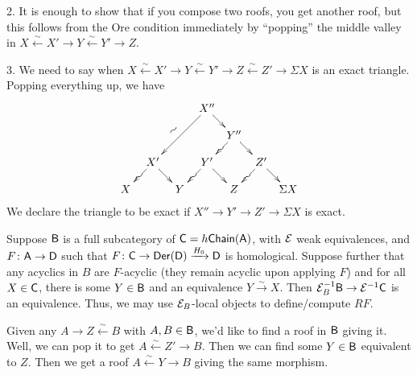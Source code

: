 2. It is enough to show that if you compose two roofs, you get another roof, but this follows from the Ore condition immediately by ``popping'' the middle valley in $X\xleftarrow\sim X'\to Y\xleftarrow\sim Y' \to Z$.

3. We need to say when $X\xleftarrow\sim X'\to Y\xleftarrow\sim Y' \to Z \xleftarrow\sim Z'\to \Sigma X$ is an exact triangle. Popping everything up, we have
\[\xymatrix@!0{
 & & & X''\ar[ddll]_@{~}\ar[dr]\\
 & & & & Y'' \ar[dl]|@{~}\ar[dr]\\
 & X'\ar[dl]|@{~}\ar[dr] && Y'\ar[dl]|@{~}\ar[dr] && Z'\ar[dl]|@{~}\ar[dr]\\
 X&&Y&&Z&& \Sigma X
}\]
We declare the triangle to be exact if $X''\to Y'\to Z'\to \Sigma X$ is exact.

\begin{proposition}
 Suppose $\text{\sf B}$ is a full subcategory of $\text{\sf C}=h\text{\sf Chain}(\text{\sf A})$, with $\mathcal{E}$ weak equivalences, and $F\colon \text{\sf A}\to \text{\sf D}$ such that $F\colon \text{\sf C}\to \operatorname{\sf Der}(\text{\sf D})\xrightarrow{H_0}\text{\sf D}$ is homological. Suppose further that any acyclics in $B$ are $F$-acyclic (they remain acyclic upon applying $F$) and for all $X\in \text{\sf C}$, there is some $Y\in \text{\sf B}$ and an equivalence $Y\xrightarrow\sim X$. Then $\mathcal{E}_B^{-1}\text{\sf B}\to \mathcal{E}^{-1}\text{\sf C}$ is an equivalence. Thus, we may use $\mathcal{E}_B$-local objects to define/compute $RF$.
\end{proposition}
Given any $A\to Z\xleftarrow\sim B$ with $A,B\in \text{\sf B}$, we'd like to find a roof in $\text{\sf B}$ giving it. Well, we can pop it to get $A\xleftarrow\sim Z'\to B$. Then we can find some $Y\in \text{\sf B}$ equivalent to $Z$. Then we get a roof $A\xleftarrow\sim Y\to B$ giving the same morphism.

